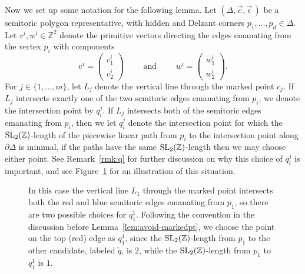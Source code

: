 \documentclass[10pt,a4paper]{amsart}
\numberwithin{equation}{section}
\def\Z{{\mathbb Z}}
\newcommand{\De}{\Delta}
\newcommand{\SL}{{\rm SL}_2(\Z)}
\newcommand{\strep}{(\De,\vec{c},\vec{\epsilon}\,)}
\newcommand{\vectbig}[2]{\begin{pmatrix} #1 \\ #2 \end{pmatrix}}
\theoremstyle{definition}
\theoremstyle{plain}
\theoremstyle{plain}
\begin{document}
 Now we set up some notation for the following lemma.
 Let $\strep$ be a semitoric polygon representative, with hidden and Delzant corners $p_1,\ldots,p_d\in\De$.
 Let $v^i,w^i\in\Z^2$ denote the primitive vectors directing the edges emanating from the vertex $p_i$ with components
 \[v^i = \vectbig{v^i_1}{v^i_2}\qquad \text{ and }\qquad w^i = \vectbig{w^i_1}{w^i_2}.\]
 For $j\in\{1,\ldots, m\}$,
 let $L_j$ denote the vertical line through the marked point $c_j$.
 If $L_j$ intersects exactly one of the two semitoric edges emanating from $p_i$, we denote the intersection point by $q_i^j$.
 If $L_j$ intersects both of the semitoric edges emanating from $p_i$, then we let $q_i^j$ denote the intersection point for which the $\SL$-length of the piecewise linear path from $p_i$ to the intersection point along $\partial\De$ is minimal,
 if the paths have the same $\SL$-length then we may choose either point.
 See Remark~\ref{rmk:q} for further discussion on why this choice of $q_i^j$ is important, and see Figure~\ref{fig:q-choice} for an illustration of this situation.

 \begin{figure}[t]
 \centering
 \caption{In this case the vertical line $L_1$ through the marked point intersects both the red and blue semitoric edges emanating from $p_1$, so there are two possible choices for $q_1^1$. Following the convention in the discussion before Lemma~\ref{lem:avoid-markedpt}, we choose the point on the top (red) edge as $q_1^1$, since the $\SL$-length from $p_1$ to the other candidate, labeled $\tilde{q}$, is $2$, while the $\SL$-length from $p_1$ to $q_1^1$ is $1$.}
 \label{fig:q-choice}
 \end{figure}
\end{document}
